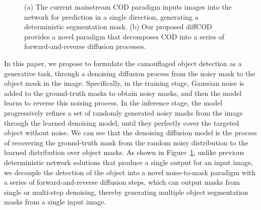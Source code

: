 \documentclass{ecai}
\begin{document}
\begin{figure}[t]
    \centering
  \vspace{-12pt}
  \caption{(a) The current mainstream COD paradigm inputs images into the network for prediction in a single direction, generating a deterministic segmentation mask. (b) Our proposed diffCOD provides a novel paradigm that decomposes COD into a series of forward-and-reverse diffusion processes.}
  \label{fig:introdcution}
  \vspace{-8pt}
\end{figure}




In this paper, we propose to formulate the camouflaged object detection as a generative task, through a denoising diffusion process from the noisy mask to the object mask in the image. Specifically, in the training stage, Gaussian noise is added to the ground-truth masks to obtain noisy masks, and then the model learns to reverse this noising process. In the inference stage, the model progressively refines a set of randomly generated noisy masks from the image through the learned denoising model, until they perfectly cover the targeted object without noise.
We can see that the denoising diffusion model is the process of recovering the ground-truth mask from the random noisy distribution to the learned distribution over object masks. As shown in Figure~\ref{fig:introdcution}, unlike previous deterministic network solutions that produce a single output for an input image, we decouple the detection of the object into a novel noise-to-mask paradigm with a series of forward-and-reverse diffusion steps, which can output masks from single or multi-step denoising, thereby generating multiple object segmentation masks from a single input image.
\end{document}
